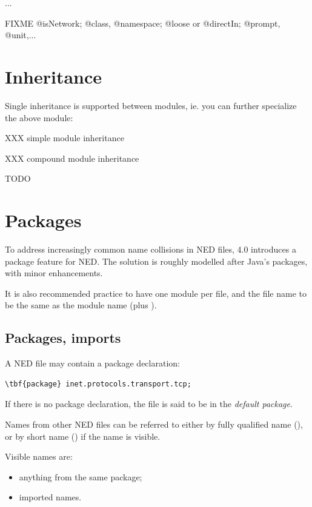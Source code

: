 ...

FIXME @isNetwork; @class, @namespace; @loose or @directIn; @prompt, @unit,...



\section{Inheritance}
\label{sec:ch-ned-lang:inheritance}

Single inheritance is supported between modules, ie. you can further
specialize the above module:

XXX simple module inheritance

XXX compound module inheritance

TODO



\section{Packages}

To address increasingly common name collisions in NED files,
{\opp} 4.0 introduces a package feature for NED. The solution
is roughly modelled after Java's packages, with minor enhancements.

It is also recommended practice to have one module per file,
and the file name to be the same as the module name (plus ).

\subsection{Packages, imports}

A NED file may contain a package declaration:

\begin{Verbatim}[commandchars=\\\{\}]
\tbf{package} inet.protocols.transport.tcp;
\end{Verbatim}

If there is no package declaration, the file is said to be in the
\textit{default package}.

Names from other NED files can be referred to either by fully qualified
name (), or by short name
() if the name is visible.

Visible names are:
\begin{itemize}
  \item anything from the same package;
  \item imported names.
\end{itemize}

